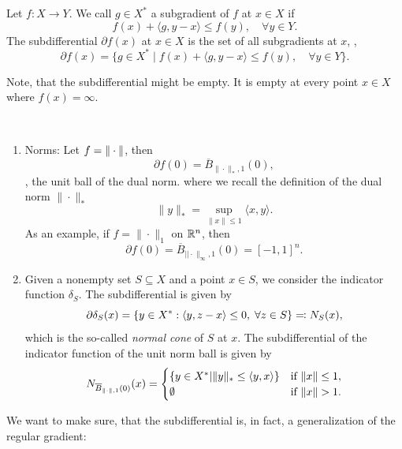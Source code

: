\begin{defn}[Subdifferential]
    Let $f:X\rightarrow Y$. We call $g\in X^*$ a subgradient of $f$ at $x\in X$ if 
    \begin{equation}
        f(x) + \langle g, y-x\rangle\leq f(y), \quad \forall y\in Y.
    \end{equation}
    The subdifferential $\partial f(x)$ at $x\in X$ is the set of all subgradients at $x$, \ie, 
    \begin{equation}
        \partial f(x) =\{ g\in X^*\;|\; f(x) + \langle g, y-x\rangle\leq f(y), \quad \forall y\in Y \}.
    \end{equation}
\end{defn}

Note, that the subdifferential might be empty. It is empty at every point $x\in X$ where $f(x)=\infty$. 

\begin{example}\
    \begin{enumerate}
        \item Norms: Let $f = \|\cdot\|$, then
			\[
				\partial f(0) = \overline{B}_{\|\cdot\|_*, 1}(0),
			\]
            \ie, the unit ball of the dual norm.
            where we recall the definition of the dual norm $\|\cdot\|_*$
            \[
                \|y\|_* = \sup_{\|x\|\leq 1} \langle x,y\rangle.
            \]
			As an example, if \( f = \|\cdot\|_1\) on \( \mathbb{R}^n \), then
			\[
				\partial f(0) = \overline{B}_{||\cdot\|_\infty,1}(0) = [-1,1]^n.
			\]
        \item Given a nonempty set $S \subseteq X$ and a point $x \in S$, we consider the indicator function $\delta_S$. The subdifferential is given by
			\[
				\partial\delta_S(x)=\left\{y\in X^\ast:\left\langle y , z-x\right\rangle\leq 0,\;\forall z\in S\right\}\eqqcolon N_S(x),
			\]
			which is the so-called \emph{normal cone} of $S$ at $x$.
			The subdifferential of the indicator function of the unit norm ball is given by
			\[
				N_{\overline{B}_{\|\cdot\|, 1}(0)}(x)=
				\begin{cases}
					\{y\in X^\ast|\|y\|_*\leq \inner{y}{x}\}&\text{if }\norm{x}\leq 1,\\
					\emptyset&\text{if }\norm{x}>1.
				\end{cases}
            \]
    \end{enumerate}
\end{example}


We want to make sure, that the subdifferential is, in fact, a generalization of the regular gradient:

